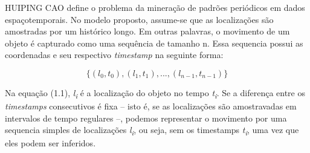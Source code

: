 \documentclass[ppgc,pep]{iiufrgs}
\begin{document}



HUIPING CAO define o problema da mineração de padrões
periódicos em dados espaçotemporais. No modelo proposto,
assume-se que as localizações são amostradas por um histórico
longo. Em outras palavras, o movimento de um objeto é capturado
como uma sequência de tamanho n. Essa sequencia possui 
as coordenadas e seu respectivo {\it timestamp} na seguinte forma:


\begin{equation}
\{(l_0, t_0), (l_1, t_1), ..., (l_{n-1}, t_{n-1})\}
\end{equation}

Na equação (1.1), {\it l\textsubscript{i}} é a localização do objeto no tempo {\it t\textsubscript{i}}.
Se a diferença entre os {\it timestamps} consecutivos é fixa -- isto é,
se as localizações são amostravadas em intervalos de tempo regulares --,
podemos representar o movimento por uma sequencia simples de localizações
{\it l\textsubscript{i}}, ou seja, sem os timestamps {\it t\textsubscript{i}}, uma vez que eles podem ser inferidos.
\end{document}
